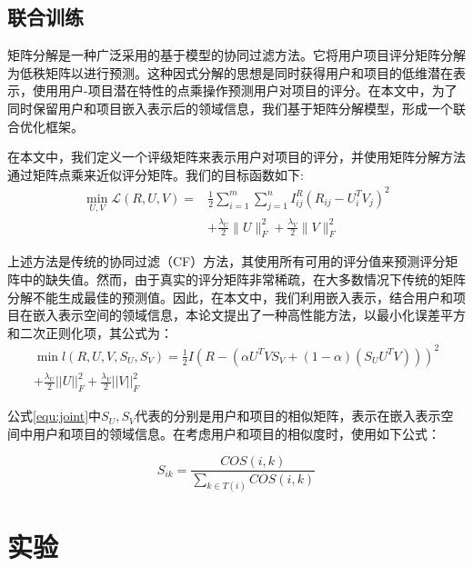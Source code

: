 \documentclass[lang=cn,11pt]{elegantpaper}
\begin{document}
\subsection{联合训练}

矩阵分解是一种广泛采用的基于模型的协同过滤方法。它将用户项目评分矩阵分解为低秩矩阵以进行预测。这种因式分解的思想是同时获得用户和项目的低维潜在表示，使用用户-项目潜在特性的点乘操作预测用户对项目的评分。在本文中，为了同时保留用户和项目嵌入表示后的领域信息，我们基于矩阵分解模型，形成一个联合优化框架。

在本文中，我们定义一个评级矩阵来表示用户对项目的评分，并使用矩阵分解方法通过矩阵点乘来近似评分矩阵。我们的目标函数如下:
\begin{equation} \label{equ:joint}
\begin{aligned} \min _{U, V} \mathcal{L}(R, U, V)=& \frac{1}{2} \sum_{i=1}^{m} \sum_{j=1}^{n} I_{i j}^{R}\left(R_{i j}-U_{i}^{T} V_{j}\right)^{2} \\ &+\frac{\lambda_{U}}{2}\|U\|_{F}^{2}+\frac{\lambda_{V}}{2}\|V\|_{F}^{2} \end{aligned}
\end{equation}

上述方法是传统的协同过滤（CF）方法，其使用所有可用的评分值来预测评分矩阵中的缺失值。然而，由于真实的评分矩阵非常稀疏，在大多数情况下传统的矩阵分解不能生成最佳的预测值。因此，在本文中，我们利用嵌入表示，结合用户和项目在嵌入表示空间的领域信息，本论文提出了一种高性能方法，以最小化误差平方和二次正则化项，其公式为：
\begin{equation} \label{equ:joint}
\begin{array}{c}
\min l(R,U,V,{S_U},{S_V}) = \frac{1}{2}I{(R - (\alpha  {U^T}V{S_V} +  (1 - \alpha )({S_U} {U^T}V) ))^2}\\
+ \frac{{{\lambda _U}}}{2}||U||_F^2 + \frac{{{\lambda _V}}}{2}||V||_F^2
\end{array}
\end{equation}

公式\ref{equ:joint}中${S_U},{S_V}$代表的分别是用户和项目的相似矩阵，表示在嵌入表示空间中用户和项目的领域信息。在考虑用户和项目的相似度时，使用如下公式：

\begin{equation}
S_{ik} = \frac{COS(i,k)}{\sum_{k \in T(i)} COS(i,k)} 
\end{equation}

\section{实验}
\end{document}

